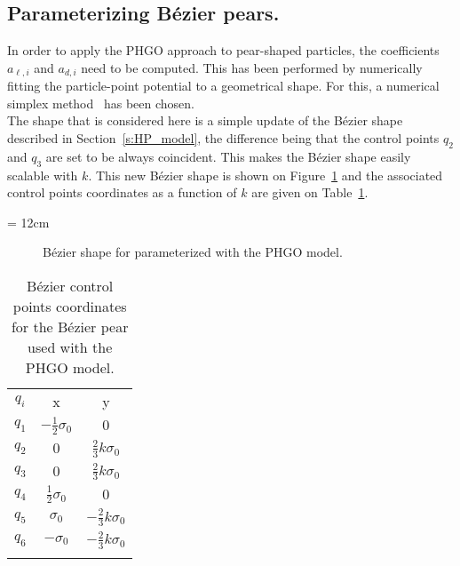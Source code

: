 \subsection{Parameterizing B\'ezier pears.}

In order to apply the PHGO approach to pear-shaped particles, the coefficients $a_{\ell,i}$ and
$a_{d,i}$ need to be computed. This has been performed by numerically fitting the particle-point
potential to a geometrical shape. For this, a numerical simplex  method~\cite{NumericalRecipes}
has been chosen.\\
The shape that is considered here is a simple update of the B\'ezier shape described in
Section~\ref{s:HP_model}, the difference being that the control points $q_2$ and $q_3$ are set
to be always coincident. This makes the B\'ezier shape easily scalable with $k$. 
This new B\'ezier shape is shown on Figure~\ref{fig:GBP_BzPear} and the associated control
points coordinates as a function of $k$ are given on Table~\ref{tble:GBP_CtrlCoords}.

\picW = 12cm
\begin{figure}
	\centering
	\hspace*{2cm}
	\caption{B\'ezier shape for parameterized with the PHGO model.}
	\label{fig:GBP_BzPear}
\end{figure}

\begin{table}
	\centering
	\begin{tabular}{||c||c||c||}
	\hhline{|t:=:t:=:t:=:t|}
	\hspace{5mm}$q_i$\hspace{5mm}	&\hspace{5mm}x\hspace{5mm}	&\hspace{5mm}y\hspace{5mm}	\\
	\hhline{|:=::=::=:|}
	$q_1$				&$-\frac{1}{2}\sigma_0$		&$0$			\\
	$q_2$				&$0$				&$\frac{2}{3}k\sigma_0$	\\
	$q_3$				&$0$				&$\frac{2}{3}k\sigma_0$	\\
	$q_4$				&$\frac{1}{2}\sigma_0$		&$0$			\\
	$q_5$				&$\sigma_0$			&$-\frac{2}{3}k\sigma_0$\\
	$q_6$				&$-\sigma_0$			&$-\frac{2}{3}k\sigma_0$\\
	\hhline{|b:=:b:=:b:=:b|}
	\end{tabular}
	\caption{B\'ezier control points coordinates for the B\'ezier pear used with the PHGO model.}
	\label{tble:GBP_CtrlCoords}
\end{table}


